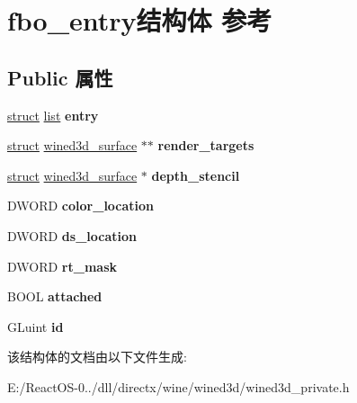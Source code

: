\hypertarget{structfbo__entry}{}\section{fbo\+\_\+entry结构体 参考}
\label{structfbo__entry}
\subsection*{Public 属性}
\begin{DoxyCompactItemize}
\item 
\mbox{\label{structfbo__entry_a0ba3cc80e7d85f4101a1bfc05dee3a9d}} 
\hyperlink{interfacestruct}{struct} \hyperlink{classlist}{list} {\bfseries entry}
\item 
\mbox{\label{structfbo__entry_a29d0a3fbf4e37619b3883eee8dc01f13}} 
\hyperlink{interfacestruct}{struct} \hyperlink{structwined3d__surface}{wined3d\+\_\+surface} $\ast$$\ast$ {\bfseries render\+\_\+targets}
\item 
\mbox{\label{structfbo__entry_a8eb9e77fdf5db5b3f482b9bb1f1d14ea}} 
\hyperlink{interfacestruct}{struct} \hyperlink{structwined3d__surface}{wined3d\+\_\+surface} $\ast$ {\bfseries depth\+\_\+stencil}
\item 
\mbox{\label{structfbo__entry_ab363f8c797152ed40185d23b8e89c88a}} 
D\+W\+O\+RD {\bfseries color\+\_\+location}
\item 
\mbox{\label{structfbo__entry_abb5c63762097a40ff97e7be7e1d6712f}} 
D\+W\+O\+RD {\bfseries ds\+\_\+location}
\item 
\mbox{\label{structfbo__entry_af251635922ac7ade1b44e7c5ff794994}} 
D\+W\+O\+RD {\bfseries rt\+\_\+mask}
\item 
\mbox{\label{structfbo__entry_a38644fb89cef640ff0f265e830c8eb83}} 
B\+O\+OL {\bfseries attached}
\item 
\mbox{\label{structfbo__entry_a128b8c47c76d82ec4447a5363513256d}} 
G\+Luint {\bfseries id}
\end{DoxyCompactItemize}


该结构体的文档由以下文件生成\+:\begin{DoxyCompactItemize}
\item 
E\+:/\+React\+O\+S-\/0../dll/directx/wine/wined3d/wined3d\+\_\+private.\+h\end{DoxyCompactItemize}
